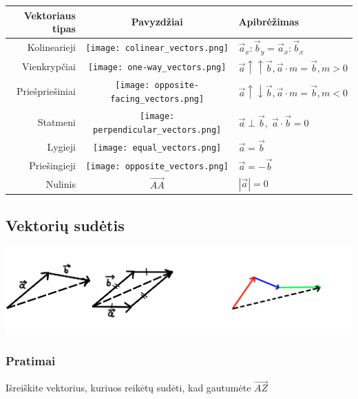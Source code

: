 \begin{table}[h]
    \begin{tabular}{rcl}
        Vektoriaus tipas& Pavyzdžiai & Apibrėžimas \\ \hline
        Kolinearieji    & \texttt{[image: colinear\_vectors.png]} & $\vec{a}_x : \vec{b}_y = \vec{a}_x : \vec{b}_x$ \\
        Vienkrypčiai    & \texttt{[image: one-way\_vectors.png]} & $\vec{a} \uparrow \uparrow \vec{b}, \vec{a} \cdot m = \vec{b}, m > 0$  \\
        Priešpriešiniai & \texttt{[image: opposite-facing\_vectors.png]} & $\vec{a} \uparrow \downarrow \vec{b}, \vec{a} \cdot m = \vec{b}, m < 0$ \\
        Statmeni        & \texttt{[image: perpendicular\_vectors.png]} & $\vec{a} \perp \vec{b}, \;\vec{a} \cdot \vec{b} = 0 $ \\
        Lygieji         & \texttt{[image: equal\_vectors.png]} & $\vec{a} = \vec{b}$ \\
        Priešingieji    & \texttt{[image: opposite\_vectors.png]} & $\vec{a} = -\vec{b}$ \\
        Nulinis         & $\vec{AA}$ & $|\vec{a}| = 0$
    \end{tabular}
\end{table}

\clearpage

\subsection{Vektorių sudėtis}
\includegraphics{assets/vector_addition.png}

\subsubsection{Pratimai}

Išreiškite vektorius, kuriuos reikėtų sudėti, kad gautumėte $\vec{AZ}$

